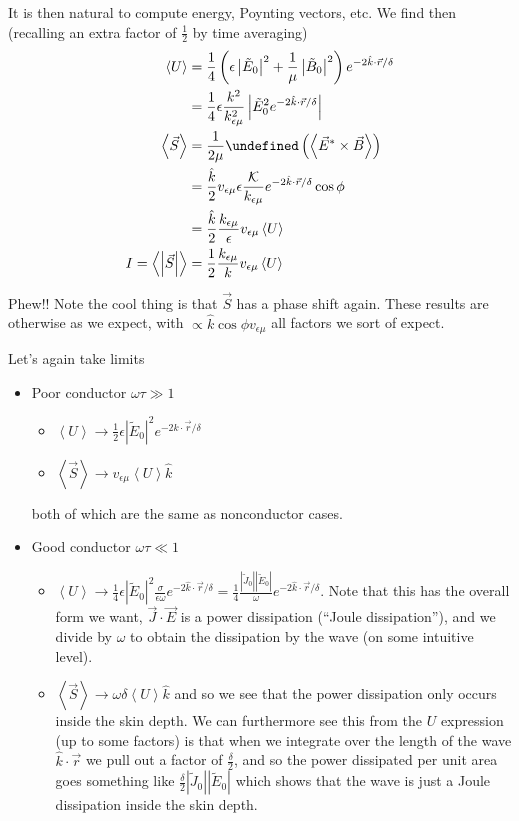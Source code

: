\documentclass[10pt]{report}
\let\Re\undefined
\DeclareMathOperator{\Re}{Re}
\newcommand{\expvalue}[1]{\left<#1\right>}
\newcommand{\abs}[1]{\left|#1\right|}
\begin{document}
It is then natural to compute energy, Poynting vectors, etc. We find then (recalling an extra factor of $\frac{1}{2}$ by time averaging)
\begin{align}
    \expvalue{U} &= \frac{1}{4}\left( \epsilon \abs{\tilde{E}_0}^2 + \frac{1}{\mu}\abs{\tilde{B}_0}^2 \right)e^{-2\hat{k} \cdot \vec{r}/\delta}\\
    &= \frac{1}{4}\epsilon \frac{k^2}{k_{\epsilon \mu}^2}\abs{\tilde{E}_0^2 e^{-2\hat{k} \cdot \vec{r}/\delta}}\\
    \expvalue{\vec{S}} &= \frac{1}{2\mu }\Re\left( \expvalue{\vec{E}^* \times \vec{B}} \right) \\
    &= \frac{\hat{k}}{2} v_{\epsilon \mu} \epsilon \frac{\mathcal{K}}{k_{\epsilon \mu}} e^{-2\hat{k} \cdot \vec{r}/\delta}\cos\phi\\
    &= \frac{\hat{k}}{2} \frac{k_{\epsilon \mu}}{\epsilon}v_{\epsilon \mu}\expvalue{U}\\
    I = \expvalue{\abs{\vec{S}}} &= \frac{1}{2}\frac{k_{\epsilon \mu}}{k}v_{\epsilon \mu}\expvalue{U}
\end{align}

Phew!! Note the cool thing is that $\vec{S}$ has a phase shift again. These results are otherwise as we expect, with $\propto \hat{k} \cos \phi v_{\epsilon \mu}$ all factors we sort of expect.

Let's again take limits
\begin{itemize}
    \item Poor conductor $\omega \tau \gg 1$
        \begin{itemize}
            \item $\expvalue{ U} \to \frac{1}{2}\epsilon \abs{\tilde{E}_0}^2 e^{-2\hat{k} \cdot \vec{r}/\delta}$
            \item $\expvalue{\vec{S}} \to v_{\epsilon \mu} \expvalue{U}\hat{k}$
        \end{itemize}
        both of which are the same as nonconductor cases.
    \item Good conductor $\omega \tau \ll 1$
        \begin{itemize}
            \item $\expvalue{ U} \to \frac{1}{4}\epsilon \abs{\tilde{E}_0}^2 \frac{\sigma}{\epsilon \omega}e^{-2\hat{k}\cdot \vec{r}/\delta} = \frac{1}{4}\frac{\abs{\tilde{J}_0}\abs{\tilde{E}_0}}{\omega}e^{-2\hat{k}\cdot \vec{r}/\delta}$. Note that this has the overall form we want, $\vec{J} \cdot \vec{E}$ is a power dissipation (``Joule dissipation''), and we divide by $\omega$ to obtain the dissipation by the wave (on some intuitive level).
            \item $\expvalue{\vec{S}} \to \omega \delta \expvalue{U}\hat{k}$ and so we see that the power dissipation only occurs inside the skin depth. We can furthermore see this from the $U$ expression (up to some factors) is that when we integrate over the length of the wave $\hat{k} \cdot \vec{r}$ we pull out a factor of $\frac{\delta}{2}$, and so the power dissipated per unit area goes something like $\frac{\delta}{2} \abs{\tilde{J}_0}\abs{\tilde{E}_0}$ which shows that the wave is just a Joule dissipation inside the skin depth.
        \end{itemize}
\end{itemize}
\end{document}
